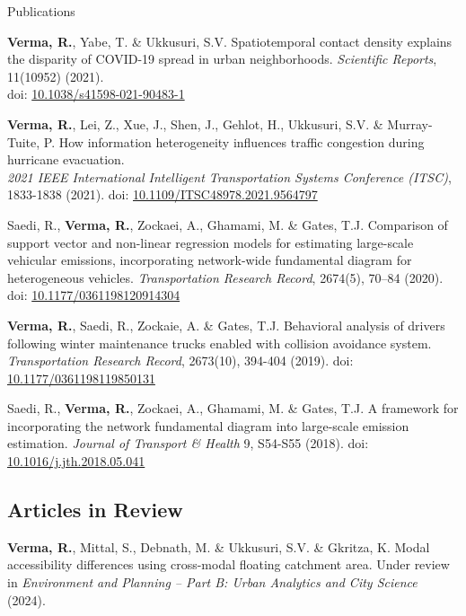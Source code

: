 \documentclass{CV} %
\begin{document}
\begin{rSection}{Publications}
\begin{etaremune}
        \item \textbf{Verma, R.}, Yabe, T. \& Ukkusuri, S.V. Spatiotemporal contact density explains the disparity of COVID-19 spread in urban neighborhoods. \textit{Scientific Reports}, 11(10952) (2021).
        \\ doi: \href{https://www.nature.com/articles/s41598-021-90483-1}{10.1038/s41598-021-90483-1}
        
        \item \textbf{Verma, R.}, Lei, Z., Xue, J., Shen, J., Gehlot, H., Ukkusuri, S.V. \& Murray-Tuite, P. How information heterogeneity influences traffic congestion during hurricane evacuation.
        \\ \textit{2021 IEEE International Intelligent Transportation Systems Conference (ITSC)}, 1833-1838 (2021). doi: \href{https://ieeexplore.ieee.org/document/9564797}{10.1109/ITSC48978.2021.9564797}

        \item Saedi, R., \textbf{Verma, R.}, Zockaei, A., Ghamami, M. \& Gates, T.J. Comparison of support vector and non-linear regression models for estimating large-scale vehicular emissions, incorporating network-wide fundamental diagram for heterogeneous vehicles. \textit{Transportation Research Record}, 2674(5), 70–84 (2020). doi: \href{https://journals.sagepub.com/doi/abs/10.1177/0361198120914304}{10.1177/0361198120914304}
        
        \item \textbf{Verma, R.}, Saedi, R., Zockaie, A. \& Gates, T.J. Behavioral analysis of drivers following winter maintenance trucks enabled with collision avoidance system. \textit{Transportation Research Record}, 2673(10), 394-404 (2019). doi: \href{https://journals.sagepub.com/doi/abs/10.1177/0361198119850131}{10.1177/0361198119850131}
        
        \item Saedi, R., \textbf{Verma, R.}, Zockaei, A., Ghamami, M. \& Gates, T.J. A framework for incorporating the network fundamental diagram into large-scale emission estimation. \textit{Journal of Transport \& Health} 9, S54-S55 (2018). doi: \href{https://www.sciencedirect.com/science/article/abs/pii/S2214140518302263}{10.1016/j.jth.2018.05.041}
    \end{etaremune}
    
    \subsection*{Articles in Review}
    \begin{etaremune}
        \item \textbf{Verma, R.}, Mittal, S., Debnath, M. \& Ukkusuri, S.V. \& Gkritza, K. Modal accessibility differences using cross-modal floating catchment area. Under review in \textit{Environment and Planning – Part B: Urban Analytics and City Science} (2024).
        

\end{etaremune}
\end{rSection}
\end{document}
